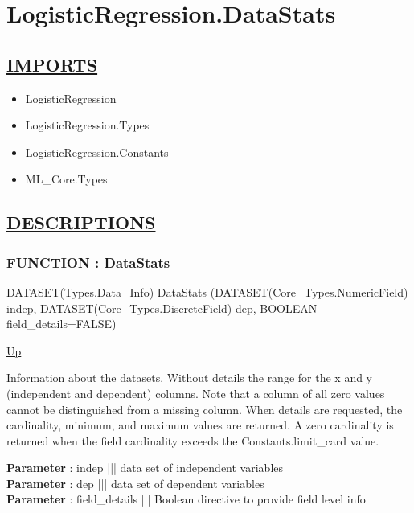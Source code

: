 \chapter*{LogisticRegression.DataStats}
\hypertarget{ecldoc:toc:LogisticRegression.DataStats}{}

\section*{\underline{IMPORTS}}
\begin{itemize}
\item LogisticRegression
\item LogisticRegression.Types
\item LogisticRegression.Constants
\item ML\_Core.Types
\end{itemize}

\section*{\underline{DESCRIPTIONS}}
\subsection*{FUNCTION : DataStats}
\hypertarget{ecldoc:logisticregression.datastats}{}
\begin{minipage}[t]{\textwidth}
\begin{flushleft}
DATASET(Types.Data\_Info) DataStats (DATASET(Core\_Types.NumericField) indep, DATASET(Core\_Types.DiscreteField) dep, BOOLEAN field\_details=FALSE)
\end{flushleft}
\end{minipage}
\hyperlink{ecldoc:toc:LogisticRegression}{Up}

\par
Information about the datasets. Without details the range for the x and y (independent and dependent) columns. Note that a column of all zero values cannot be distinguished from a missing column. When details are requested, the cardinality, minimum, and maximum values are returned. A zero cardinality is returned when the field cardinality exceeds the Constants.limit\_card value.
\par
\textbf{Parameter} : indep ||| data set of independent variables \\
\textbf{Parameter} : dep ||| data set of dependent variables \\
\textbf{Parameter} : field\_details ||| Boolean directive to provide field level info \\
